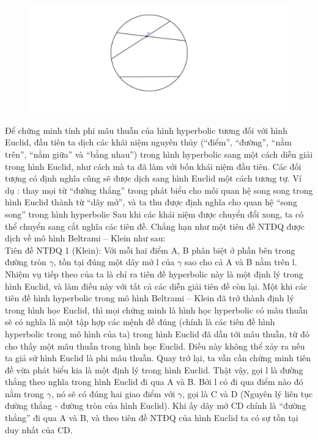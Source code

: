 \begin{figure}[ht]
\includegraphics[width=\textwidth]{Hon_mot_duong_song_song.pdf}
\end{figure}


Để chứng minh tính phi mâu thuẫn của hình hyperbolic tương đối với hình Euclid, đầu tiên ta dịch các khái niệm nguyên thủy (``điểm'', ``đường'', ``nằm trên'', ``nằm giữa'' và ``bằng nhau'') trong hình hyperbolic sang một cách diễn giải trong hình Euclid, như cách mà ta đã làm với bốn khái niệm đầu tiên. Các đối tượng có định nghĩa cũng sẽ được dịch sang hình Euclid một cách tương tự. Ví dụ : thay mọi từ ``đường thẳng'' trong phát biểu cho mối quan hệ song song trong hình Euclid thành từ ``dây mở'', và ta thu được định nghĩa cho quan hệ ``song song'' trong hình hyperbolic Sau khi các khái niệm được chuyển đổi xong, ta có thể chuyển sang cắt nghĩa các tiên đề. Chẳng hạn như một tiên đề NTĐQ được dịch về mô hình Beltrami – Klein như sau:\\
Tiên đề NTĐQ 1 (Klein): Với mỗi hai điểm A, B phân biệt ở phần bên trong đường tròn $\gamma$, tồn tại đúng một dây mở l của $\gamma$ sao cho cả A và B nằm trên l. \\

Nhiệm vụ tiếp theo của ta là chỉ ra tiên đề hyperbolic này là một định lý trong hình Euclid, và làm điều này với tất cả các diễn giải tiên đề còn lại. Một khi các tiên đề hình hyperbolic trong mô hình Beltrami – Klein đã trở thành định lý trong hình học Euclid, thì mọi chứng minh là hình học hyperbolic có mâu thuẫn sẽ có nghĩa là một tập hợp các mệnh đề đúng (chính là các tiên đề hình hyperbolic trong mô hình của ta) trong hình Euclid đã dẫn tới mâu thuẫn, từ đó cho thấy một mâu thuẫn trong hình học Euclid. Điều này không thể xảy ra nếu ta giả sử hình Euclid là phi mâu thuẫn.
Quay trở lại, ta vẫn cần chứng minh tiên đề vừa phát biểu kia là một định lý trong hình Euclid.
Thật vậy, gọi l là đường thẳng theo nghĩa trong hình Euclid đi qua A và B. Bởi l có đi qua điểm nào đó nằm trong $\gamma$, nó sẽ có đúng hai giao điểm với $\gamma$, gọi là C và D (Nguyên lý liên tục đường thẳng - đường tròn của hình Euclid). Khi ấy dây mở CD chính là ``đường thẳng'' đi qua A và B, và theo tiên đề NTĐQ của hình Euclid ta có sự tồn tại duy nhất của CD.

